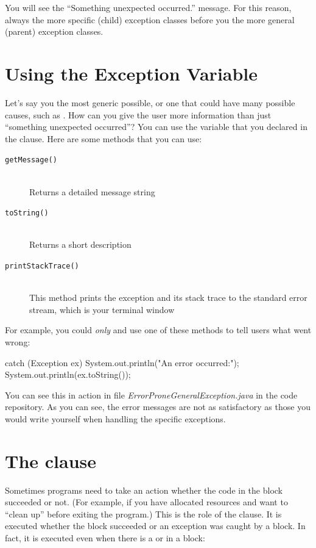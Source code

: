 You will see the ``Something unexpected occurred.'' message.  For this reason, always  the more specific (child) exception classes before you  the more general (parent) exception classes.

\section{Using the Exception Variable}
Let's say you  the most generic  possible, or one that could have many possible causes, such as . How can you give the user more information than just ``something unexpected occurred''? You can use the variable that you declared in the  clause. Here are some methods that you can use\footnotemark:


\begin{description}
  \item[\texttt{getMessage()}] \hfill \\ Returns a detailed message string
  \item[\texttt{toString()}] \hfill \\ Returns a short description
  \item[\texttt{printStackTrace()}] \hfill \\ This  method prints the exception and its stack trace to the standard error stream, which is your terminal window
\end{description}

For example, you could  {\em only}  and use one of these methods to tell users what went wrong:

\begin{code}
catch (Exception ex) {
    System.out.println("An error occurred:");
    System.out.println(ex.toString());
}
\end{code}

You can see this in action in file {\it ErrorProneGeneralException.java} in the code repository. As you can see, the error messages are not as satisfactory as those you would write yourself when handling the specific exceptions.

\section{The  clause}
Sometimes programs need to take an action whether the code in the  block succeeded or not. (For example, if you have allocated resources and want to ``clean up'' before exiting the program.) This is the role of the  clause. It is executed whether the  block succeeded or an exception was caught by a  block. In fact, it is executed even when there is a  or  in a block:


